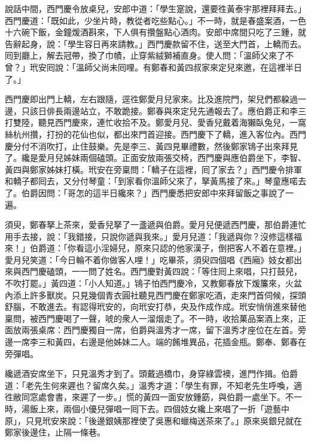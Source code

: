 說話中間，西門慶令放桌兒，安郎中道：「學生寔說，還要徃黃泰宇那裡拜拜去。」西門慶道：「既如此，少坐片時，教從者吃些點心。」不一時，就是春盛案酒，一色十六碗下飯，金鐘煖酒斟來，下人俱有攢盤點心酒肉。安郎中席間只吃了三鍾，就告辭起身，說：「學生容日再來請教。」西門慶款留不住，送至大門首，上轎而去。囘到廳上，解去冠帶，換了巾幘，止穿紫絨獅補直身。使人問：「溫師父來了不曾？」玳安囘說：「溫師父尚未囘哩。有鄭春和黃四叔家來定兒來邀，在這裡半日了。」

西門慶即出門上轎，左右跟隨，逕徃鄭愛月兒家來。比及進院門，架兒們都躱過一邊，只該日俳長兩邊站立，不敢跪接。{}鄭春與來定兒先通報去了。應伯爵正和李三打雙陸，聽見西門慶來，連忙收拾不及。鄭愛月兒、愛香兒戴着海獺臥兔兒，一窩絲杭州攢，打扮的花仙也似，都出來門首迎接。西門慶下了轎，進入客位內。西門慶分付不消吹打，{}止住鼓樂。先是李三、黃四見畢禮數，然後鄭家鴇子出來拜見了。纔是愛月兒姊妹兩個磕頭。正面安放兩張交椅，西門慶與應伯爵坐下，李智、黃四與鄭家姊妹打橫。玳安在旁稟問：「轎子在這裡，囘了家去？」西門慶令排軍和轎子都囘去，又分付琴童：「到家看你溫師父來了，拏黃馬接了來。」琴童應喏去了。伯爵因問：「哥怎的這半日纔來？」西門慶悉把安郎中來拜留飯之事說了一遍。

須臾，鄭春拏上茶來，愛香兒拏了一盞遞與伯爵。愛月兒便遞西門慶，那伯爵連忙用手去接，說：「我錯接，只說你遞與我來。」愛月兒道：「我遞與你？沒修這樣福來！」伯爵道：「你看這小淫婦兒，原來只認的他家漢子，倒把客人不着在意裡。」{}愛月兒笑道：「今日輪不着你做客人哩！」吃畢茶，須臾四個唱《西廂》妓女都出來與西門慶磕頭，一一問了姓名。西門慶對黃四說：「等住囘上來唱，只打鼓兒，不吹打罷。」黃四道：「小人知道。」鴇子怕西門慶冷，又教鄭春放下煖簾來，火盆內添上許多獸炭。只見幾個青衣圓社聽見西門慶在鄭家吃酒，走來門首伺候，探頭舒腦，不敢進去。有認得玳安的，向玳安打恭，央及作成作成。玳安悄俏進來替他稟問，被西門慶喝了一聲，{}唬的衆人一溜烟走了。不一時，收拾菓品案酒上來，正面放兩張桌席：西門慶獨自一席，伯爵與溫秀才一席，留下溫秀才座位在左首。旁邊一席李三和黃四，右邊是他姊妹二人。端的餚堆異品，花插金瓶。鄭奉、鄭春在旁彈唱。

纔遞酒安席坐下，只見溫秀才到了。頭戴過橋巾，身穿綠雲襖，進門作揖。伯爵道：「老先生何來遲也？留席久矣。」溫秀才道：「學生有罪，不知老先生呼喚，適徃敝同窓處會書，來遲了一步。」{}{}慌的黃四一面安放鍾筯，與伯爵一處坐下。不一時，湯飯上來，兩個小優兒彈唱一囘下去。四個妓女纔上來唱了一折「遊藝中原」，只見玳安來說：「後邊銀姨那裡使了吳惠和蠟梅送茶來了。」原來吳銀兒就在鄭家後邊住，止隔一條巷。

